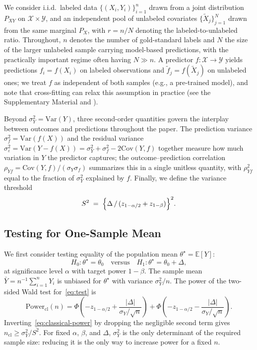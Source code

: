 \documentclass[12pt]{article}
\newcommand{\E}{\mathbb{E}}
\newcommand{\Var}{\mathrm{Var}}
\newcommand{\Cov}{\mathrm{Cov}}
\newcommand{\wt}{\widetilde}
\begin{document}
We consider i.i.d.\ labeled data $\{(X_i, Y_i)\}_{i=1}^{n}$ drawn from a
joint distribution $P_{XY}$ on $\mathcal{X} \times \mathcal{Y}$, and an
independent pool of unlabeled covariates $\{\wt{X}_j\}_{j=1}^{N}$ drawn from
the same marginal $P_X$, with $r = n/N$ denoting the labeled-to-unlabeled
ratio. Throughout, $n$ denotes the number of gold-standard labels and $N$ the size of the larger unlabeled sample carrying model-based predictions, with the practically important regime often having $N \gg n$. 
A predictor $f : \mathcal{X} \to \mathcal{Y}$ yields predictions
$f_i = f(X_i)$ on labeled observations and $\wt{f}_j = f(\wt{X}_j)$ on
unlabeled ones; we treat $f$ as independent of both samples (e.g., a
pre-trained model), and note that cross-fitting can relax this assumption in
practice (see the Supplementary Material and \citet{zrnic2024cross}).

Beyond $\sigma_Y^2 = \Var(Y)$, three second-order quantities govern the
interplay between outcomes and predictions throughout the paper. The prediction
variance $\sigma_f^2 = \Var(f(X))$ and the residual variance
$\sigma_\varepsilon^2 = \Var(Y - f(X)) = \sigma_Y^2 + \sigma_f^2 - 2\Cov(Y,f)$
together measure how much variation in $Y$ the predictor captures; the
outcome--prediction correlation $\rho_{Yf} = \Cov(Y,f)/(\sigma_Y\sigma_f)$
summarizes this in a single unitless quantity, with $\rho_{Yf}^2$ equal to the
fraction of $\sigma_Y^2$ explained by $f$. Finally, we define the variance
threshold
\begin{equation}\label{eq:s2-threshold}
  S^2 \;=\; \Bigl\{\Delta \,/\, (z_{1-\alpha/2}+z_{1-\beta})\Bigr\}^2.
\end{equation}
\subsection{Testing for One-Sample Mean}
\label{sec:classical}

We first consider testing equality of the population mean $\theta^\star = \E[Y]$:
\begin{equation}\label{eq:test}
  H_0 : \theta^\star = \theta_0
  \quad\text{versus}\quad
  H_1 : \theta^\star = \theta_0 + \Delta,
\end{equation}
at significance level $\alpha$ with target power $1-\beta$. The sample mean
$\bar{Y} = n^{-1}\sum_{i=1}^n Y_i$ is unbiased for $\theta^\star$ with
variance $\sigma_Y^2/n$. The power of the two-sided Wald test
for~\eqref{eq:test} is
\begin{equation}\label{eq:classical-power}
  \mathrm{Power}_{\mathrm{cl}}(n)
  = \Phi\!\left(-z_{1-\alpha/2} + \frac{|\Delta|}{\sigma_Y/\sqrt{n}}\right)
  + \Phi\!\left(-z_{1-\alpha/2} - \frac{|\Delta|}{\sigma_Y/\sqrt{n}}\right).
\end{equation}
Inverting~\eqref{eq:classical-power} by dropping the negligible second term gives $n_{\mathrm{cl}} \ge \sigma_Y^2 / S^2$. For fixed $\alpha$, $\beta$, and $\Delta$, $\sigma_Y^2$ is the only determinant of the required sample
size: reducing it is the only way to increase power for a fixed $n$.
\end{document}
